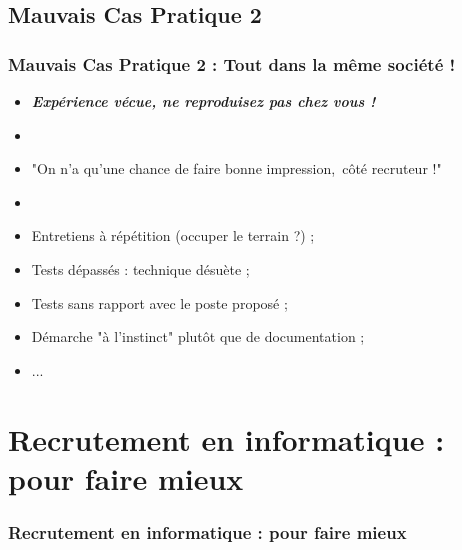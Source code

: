 \documentclass[slidetop,11pt]{beamer}
\begin{document}
\subsection{Mauvais Cas Pratique 2}
\begin{frame}
	\frametitle{Mauvais Cas Pratique 2 : Tout dans la m{\^e}me soci{\'e}t{\'e} !}
	\begin{itemize}
		\item \textbf{\emph{Exp{\'e}rience v{\'e}cue, ne reproduisez pas chez vous !}}
		\item[] 
		\item "On n'a qu'une chance de faire bonne impression,~\newline c{\^o}t{\'e} recruteur !"
		\item[] 
		\item Entretiens {\`a} r{\'e}p{\'e}tition (occuper le terrain ?) ; 
		\item Tests d{\'e}pass{\'e}s : technique d{\'e}su{\`e}te ; 
		\item Tests sans rapport avec le poste propos{\'e} ;  
		\item D{\'e}marche "{\`a} l'instinct" plut{\^o}t que de documentation ; 
		\item ... 
	\end{itemize}
\end{frame}


\section{Recrutement en informatique : pour faire mieux}
\begin{frame}
	\frametitle{Recrutement en informatique : pour faire mieux}
	\tableofcontents[sections=3,currentsection,subsectionstyle=show/shaded/hide] %
\end{frame}
\end{document}
